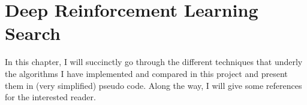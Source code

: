 
\chapter{Deep Reinforcement Learning Search} %

\label{Chapter1} %

In this chapter, I will succinctly go through the different techniques that underly the algorithms I have implemented and compared in this project and present them in (very simplified) pseudo code. Along the way, I will give some references for the interested reader.




\label{GSH}
\label{sec:TheoryBFSDFS}
\label{sec:TheoryAStar}

